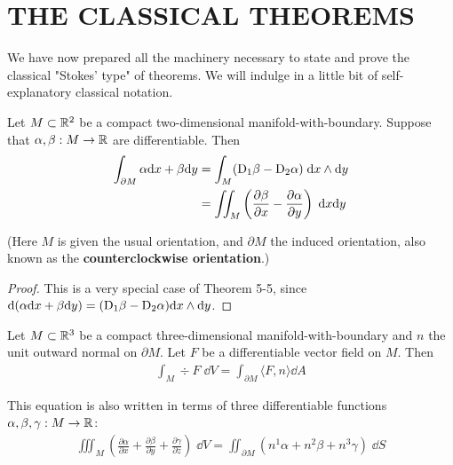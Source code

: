 \clearpage
\section{THE CLASSICAL THEOREMS}
We have now prepared all the machinery necessary to state and prove the 
classical "Stokes' type" of theorems. We will indulge in a little bit of 
self-explanatory classical notation.

\begin{theorem}
    Let $M \subset \mathbb{R}^2$ be a compact two-dimensional manifold-with-boundary.
    Suppose that $\alpha,\beta:M\to\mathbb{R}$ are differentiable. Then
    \begin{align*}
        \int_{\partial M}\alpha \mathrm{d} x+\beta \mathrm{d} y
        & = \int_{M}(\mathrm{D}_1\beta-\mathrm{D}_2\alpha)\;\mathrm{d} x\wedge\mathrm{d} y \\
        & = \iint_{M}\left(\frac{\partial\beta}{\partial x}-\frac{\partial\alpha}{\partial y}\right)\;\mathrm{d} x\mathrm{d} y
    \end{align*}
\end{theorem}

(Here $M$ is given the usual orientation, and $\partial M$ the induced
orientation, also known as the \textbf{counterclockwise orientation}.)

\begin{proof}
    This is a very special case of Theorem 5-5, 
    since $\mathrm{d}(\alpha\mathrm{d} x + \beta\mathrm{d} y) =(\mathrm{D}_1\beta-\mathrm{D}_2\alpha)\mathrm{d} x\wedge\mathrm{d} y$.
\end{proof}

\begin{theorem}
    Let $M\subset\mathbb{R}^3$ be a compact three-dimensional manifold-with-boundary and $n$ the
    unit outward normal on $\partial M$. Let $F$ be a differentiable vector field on $M$. Then
    \begin{align*}
        \int_M\div F\;\dd V = \int_{\partial M}\langle F,n\rangle\dd A
    \end{align*}

    This equation is also written in terms of three differentiable 
    functions $\alpha,\beta,\gamma:M\to\mathbb{R}$:
    \begin{align*}
        \iiint_M\left(\frac{\partial\alpha}{\partial x}+\frac{\partial\beta}{\partial y}+\frac{\partial\gamma}{\partial z}\right)\;\dd V
        = \iint_{\partial M}(n^1\alpha+n^2\beta+n^3\gamma)\;\dd S    
    \end{align*}
\end{theorem}

